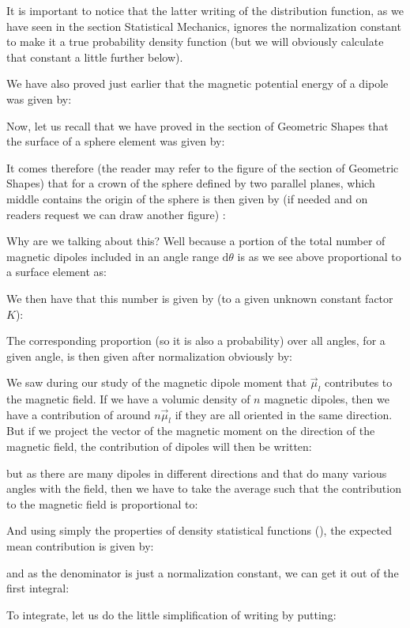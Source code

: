	It is important to notice that the latter writing  of the distribution function, as we have seen in the section Statistical Mechanics, ignores the normalization constant to make it a true probability density function (but we will obviously calculate that constant a little further below).

	We have also proved just earlier that the magnetic potential energy of a dipole was given by:
	
	Now, let us recall that we have proved in the section of Geometric Shapes that the surface of a sphere element was given by:
	
	It comes therefore (the reader may refer to the figure of the section of Geometric Shapes) that for a crown of the sphere defined by two parallel planes, which middle contains the origin of the sphere is then given by (if needed and on readers request we can draw another figure) :
	
	Why are we talking about this? Well because a portion of the total number of magnetic dipoles included in an angle range $\mathrm{d}\theta$ is as we see above proportional to a surface element as:
	
	We then have that this number is given by (to a given unknown constant factor $K$):
	
	The corresponding proportion (so it is also a probability) over all angles, for a given angle, is then given after normalization obviously by:
	
	We saw during our study of the magnetic dipole moment that $\vec{\mu}_l$ contributes to the magnetic field. If we have a volumic density of $n$ magnetic dipoles, then we have a contribution of around $n\vec{\mu}_l$ if they are all oriented in the same direction. But if we project the vector of the magnetic moment on the direction of the magnetic field, the contribution of dipoles will then be written:
	
	but as there are many dipoles in different directions and that do many various angles with the field, then we have to take the average such that the contribution to the magnetic field is proportional to:
	
	And using simply the properties of density statistical functions (), the expected mean contribution is given by:
	
	and as the denominator is just a normalization constant, we can get it out of the first integral:
	
	To integrate, let us do the little simplification of writing by putting:
	
